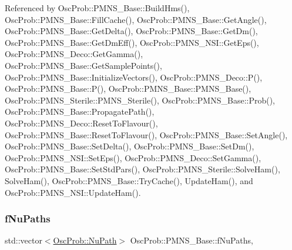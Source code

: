Referenced by Osc\+Prob\+::\+P\+M\+N\+S\+\_\+\+Base\+::\+Build\+Hms(), Osc\+Prob\+::\+P\+M\+N\+S\+\_\+\+Base\+::\+Fill\+Cache(), Osc\+Prob\+::\+P\+M\+N\+S\+\_\+\+Base\+::\+Get\+Angle(), Osc\+Prob\+::\+P\+M\+N\+S\+\_\+\+Base\+::\+Get\+Delta(), Osc\+Prob\+::\+P\+M\+N\+S\+\_\+\+Base\+::\+Get\+Dm(), Osc\+Prob\+::\+P\+M\+N\+S\+\_\+\+Base\+::\+Get\+Dm\+Eff(), Osc\+Prob\+::\+P\+M\+N\+S\+\_\+\+N\+S\+I\+::\+Get\+Eps(), Osc\+Prob\+::\+P\+M\+N\+S\+\_\+\+Deco\+::\+Get\+Gamma(), Osc\+Prob\+::\+P\+M\+N\+S\+\_\+\+Base\+::\+Get\+Sample\+Points(), Osc\+Prob\+::\+P\+M\+N\+S\+\_\+\+Base\+::\+Initialize\+Vectors(), Osc\+Prob\+::\+P\+M\+N\+S\+\_\+\+Deco\+::\+P(), Osc\+Prob\+::\+P\+M\+N\+S\+\_\+\+Base\+::\+P(), Osc\+Prob\+::\+P\+M\+N\+S\+\_\+\+Base\+::\+P\+M\+N\+S\+\_\+\+Base(), Osc\+Prob\+::\+P\+M\+N\+S\+\_\+\+Sterile\+::\+P\+M\+N\+S\+\_\+\+Sterile(), Osc\+Prob\+::\+P\+M\+N\+S\+\_\+\+Base\+::\+Prob(), Osc\+Prob\+::\+P\+M\+N\+S\+\_\+\+Base\+::\+Propagate\+Path(), Osc\+Prob\+::\+P\+M\+N\+S\+\_\+\+Deco\+::\+Reset\+To\+Flavour(), Osc\+Prob\+::\+P\+M\+N\+S\+\_\+\+Base\+::\+Reset\+To\+Flavour(), Osc\+Prob\+::\+P\+M\+N\+S\+\_\+\+Base\+::\+Set\+Angle(), Osc\+Prob\+::\+P\+M\+N\+S\+\_\+\+Base\+::\+Set\+Delta(), Osc\+Prob\+::\+P\+M\+N\+S\+\_\+\+Base\+::\+Set\+Dm(), Osc\+Prob\+::\+P\+M\+N\+S\+\_\+\+N\+S\+I\+::\+Set\+Eps(), Osc\+Prob\+::\+P\+M\+N\+S\+\_\+\+Deco\+::\+Set\+Gamma(), Osc\+Prob\+::\+P\+M\+N\+S\+\_\+\+Base\+::\+Set\+Std\+Pars(), Osc\+Prob\+::\+P\+M\+N\+S\+\_\+\+Sterile\+::\+Solve\+Ham(), Solve\+Ham(), Osc\+Prob\+::\+P\+M\+N\+S\+\_\+\+Base\+::\+Try\+Cache(), Update\+Ham(), and Osc\+Prob\+::\+P\+M\+N\+S\+\_\+\+N\+S\+I\+::\+Update\+Ham().

\mbox{\label{classOscProb_1_1PMNS__Base_a69db9d57e12fc7cbe0431bc6c18fac93}} 
\subsubsection{\texorpdfstring{f\+Nu\+Paths}{fNuPaths}}
{\footnotesize\ttfamily std\+::vector$<$\hyperlink{structOscProb_1_1NuPath}{Osc\+Prob\+::\+Nu\+Path}$>$ Osc\+Prob\+::\+P\+M\+N\+S\+\_\+\+Base\+::f\+Nu\+Paths\hspace{0.3cm}{\ttfamily [protected]}, {\ttfamily [inherited]}}



